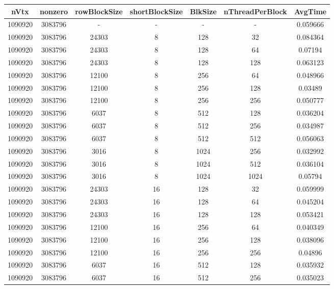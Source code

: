 \documentclass[9pt]{article}
\begin{document}
\SetBgPosition{0.25cm,-5.0cm}
\begin{tabular}{|c|c|c|c|c|c|c| }  
\hline
nVtx  & nonzero  & rowBlockSize  & shortBlockSize  & BlkSize  & nThreadPerBlock  & AvgTime \\
\hline
1090920  & 3083796  &  -  & -  & -  & -  &0.059666 \\
\hline
1090920  & 3083796  & 24303  & 8  & 128  & 32  & 0.084364 \\
\hline
1090920  & 3083796  & 24303  & 8  & 128  & 64  & 0.07194 \\
\hline
1090920  & 3083796  & 24303  & 8  & 128  & 128  & 0.063123 \\
\hline
1090920  & 3083796  & 12100  & 8  & 256  & 64  & 0.048966 \\
\hline
1090920  & 3083796  & 12100  & 8  & 256  & 128  & 0.03489 \\
\hline
1090920  & 3083796  & 12100  & 8  & 256  & 256  & 0.050777 \\
\hline
1090920  & 3083796  & 6037  & 8  & 512  & 128  & 0.036204 \\
\hline
1090920  & 3083796  & 6037  & 8  & 512  & 256  & 0.034987 \\
\hline
1090920  & 3083796  & 6037  & 8  & 512  & 512  & 0.056063 \\
\hline
1090920  & 3083796  & 3016  & 8  & 1024  & 256  & 0.032992 \\
\hline
1090920  & 3083796  & 3016  & 8  & 1024  & 512  & 0.036104 \\
\hline
1090920  & 3083796  & 3016  & 8  & 1024  & 1024  & 0.05794 \\
\hline
1090920  & 3083796  & 24303  & 16  & 128  & 32  & 0.059999 \\
\hline
1090920  & 3083796  & 24303  & 16  & 128  & 64  & 0.045204 \\
\hline
1090920  & 3083796  & 24303  & 16  & 128  & 128  & 0.053421 \\
\hline
1090920  & 3083796  & 12100  & 16  & 256  & 64  & 0.040349 \\
\hline
1090920  & 3083796  & 12100  & 16  & 256  & 128  & 0.038096 \\
\hline
1090920  & 3083796  & 12100  & 16  & 256  & 256  & 0.04896 \\
\hline
1090920  & 3083796  & 6037  & 16  & 512  & 128  & 0.035932 \\
\hline
1090920  & 3083796  & 6037  & 16  & 512  & 256  & 0.035023 \\

\end{tabular}
\end{document}
